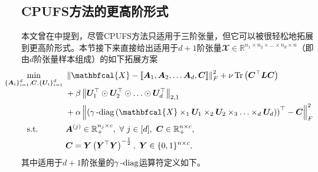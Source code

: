 
\subsection{CPUFS方法的更高阶形式}\label{sec:CPUFS-extend}
本文曾在中提到，尽管CPUFS方法只适用于三阶张量，但它可以被很轻松地拓展到更高阶形式。本节接下来直接给出适用于$d+1$阶张量$\mathbfcal{X}\in \mathbb{R}^{n_1 \times n_2 \times \ldots \times n_d\times n}$（即由$d$阶张量样本组成）的如下拓展方案
\begin{equation*}
    \begin{aligned}
    & \underset{\smash[b]{\substack{\mathclap{\{\boldsymbol{A}_{i}\}_{i=1}^{d},\boldsymbol{C},\{\boldsymbol{U}_{i}\}_{i=1}^{d}}}}}{\min}\qquad
    & &  \norm{\mathbfcal{X}-\left\llbracket \boldsymbol{A}_{1}, \boldsymbol{A}_{2}, \ldots \boldsymbol{A}_{d}, \boldsymbol{C} \right\rrbracket}_{F}^{2} + \nu\operatorname{Tr}\left(\boldsymbol{C}^{\top}\boldsymbol{L}\boldsymbol{C}\right) \\ \span&& + \beta \norm{\boldsymbol{U}_{1}^{\top}\odot\boldsymbol{U}_{2}^{\top}\odot\ldots\odot\boldsymbol{U}_{d}^{\top}}_{2,1} \\ \span&& + \alpha\norm{\left(\mydiag\left(\mathbfcal{X}\times_{1}\boldsymbol{U}_{1}\times_{2}\boldsymbol{U}_{2}\times_{3}\ldots\times_{d}\boldsymbol{U}_{d}\right)\right)^{\top} - \boldsymbol{C}}_{F}^{2} \\
    & \text{s.t.}
    & & \boldsymbol{A}^{(j)}\in \mathbb{R}_{+}^{n_j \times c},~\forall~j\in[d],~\boldsymbol{C}\in\mathbb{R}_{+}^{n\times c}, \\ \span&&\boldsymbol{C}=\boldsymbol{Y}\left(\boldsymbol{Y}^{\top} \boldsymbol{Y}\right)^{-\frac{1}{2}},~\boldsymbol{Y}\in\{0,1\}^{n\times c},
    \end{aligned}
\end{equation*}
其中适用于$d+1$阶张量的$\gamma\operatorname{-diag}$运算符定义如下。
